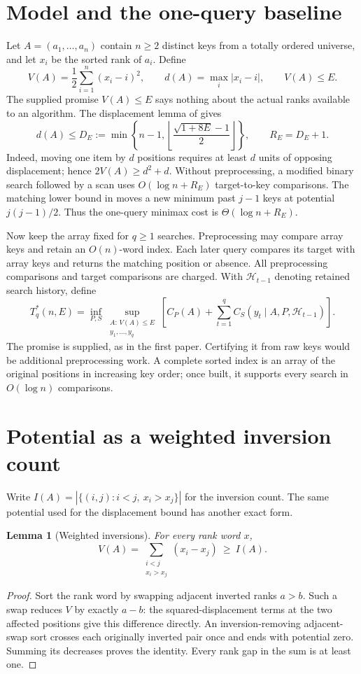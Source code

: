 \documentclass[10pt,letterpaper]{article}
\newtheorem{lemma}{Lemma}
\begin{document}
\section{Model and the one-query baseline}
Let $A=(a_1,\ldots,a_n)$ contain $n\ge2$ distinct keys from a totally
ordered universe, and let $x_i$ be the sorted rank of $a_i$. Define
\[
 V(A)=\frac12\sum_{i=1}^n(x_i-i)^2,\qquad
 d(A)=\max_i|x_i-i|,\qquad V(A)\le E.
\]
The supplied promise $V(A)\le E$ says nothing about the actual ranks
available to an algorithm. The displacement lemma of \cite{first} gives
\[
 d(A)\le D_E:=
 \min\left\{n-1,\left\lfloor\frac{\sqrt{1+8E}-1}{2}\right\rfloor\right\},
 \qquad R_E=D_E+1.
\]
Indeed, moving one item by $d$ positions requires at least $d$ units of
opposing displacement; hence $2V(A)\ge d^2+d$. Without preprocessing, a
modified binary search followed by a scan uses $O(\log n+R_E)$ target-to-key
comparisons. The matching lower bound in \cite{first} moves a new minimum
past $j-1$ keys at potential $j(j-1)/2$. Thus the one-query minimax cost is
$\Theta(\log n+R_E)$.

Now keep the array fixed for $q\ge1$ searches. Preprocessing may compare
array keys and retain an $O(n)$-word index. Each later query compares its
target with array keys and returns the matching position or absence.
All preprocessing comparisons and target comparisons are charged. With
$\mathcal H_{t-1}$ denoting retained search history, define
\[
 T_q^*(n,E)=\inf_{P,S}
 \sup_{\substack{A:\,V(A)\le E\\y_1,\ldots,y_q}}
 \left[C_P(A)+\sum_{t=1}^q C_S(y_t\mid A,P,\mathcal H_{t-1})\right].
\]
The promise is supplied, as in the first paper. Certifying it from raw
keys would be additional preprocessing work. A complete sorted index is
an array of the original positions in increasing key order; once built,
it supports every search in $O(\log n)$ comparisons.

\section{Potential as a weighted inversion count}
Write $I(A)=|\{(i,j):i<j,\ x_i>x_j\}|$ for the inversion count. The same
potential used for the displacement bound has another exact form.

\begin{lemma}[Weighted inversions]\label{lem:weighted}
For every rank word $x$,
\[
 V(A)=\sum_{\substack{i<j\\x_i>x_j}}(x_i-x_j)\ \ge\ I(A).
\]
\end{lemma}
\begin{proof}
Sort the rank word by swapping adjacent inverted ranks $a>b$. Such a
swap reduces $V$ by exactly $a-b$: the squared-displacement terms at
the two affected positions give this difference directly. An
inversion-removing adjacent-swap sort crosses each originally inverted
pair once and ends with potential zero. Summing its decreases proves
the identity. Every rank gap in the sum is at least one.
\end{proof}
\end{document}
